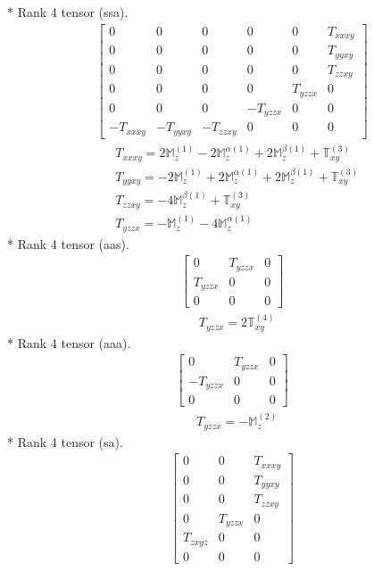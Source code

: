 \documentclass[fleqn,8pt,landscape]{jsarticle}
\begin{document}
* Rank 4 tensor (ssa).
\begin{align*}
\begin{bmatrix} 0 & 0 & 0 & 0 & 0 & T_{xxxy} \\ 0 & 0 & 0 & 0 & 0 & T_{yyxy} \\ 0 & 0 & 0 & 0 & 0 & T_{zzxy} \\ 0 & 0 & 0 & 0 & T_{yzzx} & 0 \\ 0 & 0 & 0 & - T_{yzzx} & 0 & 0 \\ - T_{xxxy} & - T_{yyxy} & - T_{zzxy} & 0 & 0 & 0 \end{bmatrix}
\end{align*}
\begin{align*}
& T_{xxxy} = 2 \mathbb{M}_{z}^{(1)} - 2 \mathbb{M}_{z}^{\alpha(1)} + 2 \mathbb{M}_{z}^{\beta(1)} + \mathbb{T}_{xy}^{(3)} \\
& T_{yyxy} = - 2 \mathbb{M}_{z}^{(1)} + 2 \mathbb{M}_{z}^{\alpha(1)} + 2 \mathbb{M}_{z}^{\beta(1)} + \mathbb{T}_{xy}^{(3)} \\
& T_{zzxy} = - 4 \mathbb{M}_{z}^{\beta(1)} + \mathbb{T}_{xy}^{(3)} \\
& T_{yzzx} = - \mathbb{M}_{z}^{(1)} - 4 \mathbb{M}_{z}^{\alpha(1)}
\end{align*}
* Rank 4 tensor (aas).
\begin{align*}
\begin{bmatrix} 0 & T_{yzzx} & 0 \\ T_{yzzx} & 0 & 0 \\ 0 & 0 & 0 \end{bmatrix}
\end{align*}
\begin{align*}
& T_{yzzx} = 2 \mathbb{T}_{xy}^{(4)}
\end{align*}
* Rank 4 tensor (aaa).
\begin{align*}
\begin{bmatrix} 0 & T_{yzzx} & 0 \\ - T_{yzzx} & 0 & 0 \\ 0 & 0 & 0 \end{bmatrix}
\end{align*}
\begin{align*}
& T_{yzzx} = - \mathbb{M}_{z}^{(2)}
\end{align*}
* Rank 4 tensor (sa).
\begin{align*}
\begin{bmatrix} 0 & 0 & T_{xxxy} \\ 0 & 0 & T_{yyxy} \\ 0 & 0 & T_{zzxy} \\ 0 & T_{yzzx} & 0 \\ T_{zxyz} & 0 & 0 \\ 0 & 0 & 0 \end{bmatrix}
\end{align*}
\end{document}
